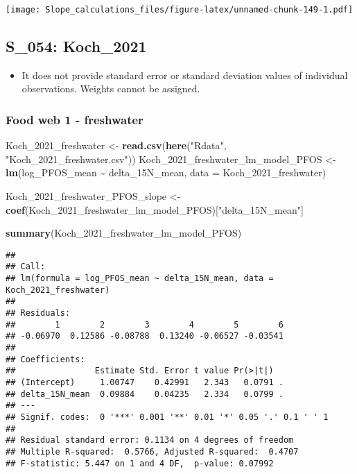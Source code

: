 \documentclass[
]{article}
\newenvironment{Shaded}{\begin{snugshade}}{\end{snugshade}}
\newcommand{\AttributeTok}[1]{\textcolor[rgb]{0.13,0.29,0.53}{#1}}
\newcommand{\FunctionTok}[1]{\textcolor[rgb]{0.13,0.29,0.53}{\textbf{#1}}}
\newcommand{\NormalTok}[1]{#1}
\newcommand{\OtherTok}[1]{\textcolor[rgb]{0.56,0.35,0.01}{#1}}
\newcommand{\SpecialCharTok}[1]{\textcolor[rgb]{0.81,0.36,0.00}{\textbf{#1}}}
\newcommand{\StringTok}[1]{\textcolor[rgb]{0.31,0.60,0.02}{#1}}
\providecommand{\tightlist}{%
  \setlength{\itemsep}{0pt}\setlength{\parskip}{0pt}}
\begin{document}
\texttt{[image: Slope\_calculations\_files/figure-latex/unnamed-chunk-149-1.pdf]}

\subsection{S\_054: Koch\_2021}\label{s_054-koch_2021-1}

\begin{itemize}
\tightlist
\item
  It does not provide standard error or standard deviation values of
  individual observations. Weights cannot be assigned.
\end{itemize}

\subsubsection{Food web 1 - freshwater}\label{food-web-1---freshwater}

\begin{Shaded}
\begin{Highlighting}[]
\NormalTok{Koch\_2021\_freshwater }\OtherTok{\textless{}{-}} \FunctionTok{read.csv}\NormalTok{(}\FunctionTok{here}\NormalTok{(}\StringTok{"Rdata"}\NormalTok{, }\StringTok{"Koch\_2021\_freshwater.csv"}\NormalTok{))}
\NormalTok{Koch\_2021\_freshwater\_lm\_model\_PFOS }\OtherTok{\textless{}{-}} \FunctionTok{lm}\NormalTok{(log\_PFOS\_mean }\SpecialCharTok{\textasciitilde{}}\NormalTok{ delta\_15N\_mean,}
                                         \AttributeTok{data =}\NormalTok{ Koch\_2021\_freshwater)}

\NormalTok{Koch\_2021\_freshwater\_PFOS\_slope }\OtherTok{\textless{}{-}} \FunctionTok{coef}\NormalTok{(Koch\_2021\_freshwater\_lm\_model\_PFOS)[}\StringTok{"delta\_15N\_mean"}\NormalTok{]}

\FunctionTok{summary}\NormalTok{(Koch\_2021\_freshwater\_lm\_model\_PFOS)}
\end{Highlighting}
\end{Shaded}

\begin{verbatim}
## 
## Call:
## lm(formula = log_PFOS_mean ~ delta_15N_mean, data = Koch_2021_freshwater)
## 
## Residuals:
##        1        2        3        4        5        6 
## -0.06970  0.12586 -0.08788  0.13240 -0.06527 -0.03541 
## 
## Coefficients:
##                Estimate Std. Error t value Pr(>|t|)  
## (Intercept)     1.00747    0.42991   2.343   0.0791 .
## delta_15N_mean  0.09884    0.04235   2.334   0.0799 .
## ---
## Signif. codes:  0 '***' 0.001 '**' 0.01 '*' 0.05 '.' 0.1 ' ' 1
## 
## Residual standard error: 0.1134 on 4 degrees of freedom
## Multiple R-squared:  0.5766, Adjusted R-squared:  0.4707 
## F-statistic: 5.447 on 1 and 4 DF,  p-value: 0.07992
\end{verbatim}
\end{document}
